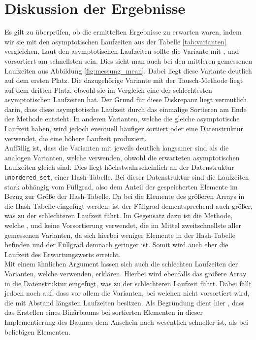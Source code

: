 \section{Diskussion der Ergebnisse}
Es gilt zu überprüfen, ob die ermittelten Ergebnisse zu erwarten waren, indem wir sie 
mit den asymptotischen Laufzeiten aus der Tabelle \ref{tab:varianten} vergleichen.
Laut den asymptotischen Laufzeiten sollte die Variante mit \SorSor{}, \distr{} und vorsortiert am schnellsten
sein. Dies sieht man auch bei den mittleren gemessenen Laufzeiten aus Abbildung \ref{fig:messung_mean}.
Dabei liegt diese Variante deutlich auf dem ersten Platz. Die dazugehörige Variante mit
der Tausch-Methode \perm{} liegt auf dem dritten Platz, obwohl sie im Vergleich eine der
schlechtesten asymptotischen Laufzeiten hat. Der Grund für diese Diskrepanz 
liegt vermutlich darin, dass diese
asymptotische Laufzeit durch das einmalige Sortieren am Ende der Methode entsteht. 
In anderen Varianten, welche die gleiche asymptotische Laufzeit haben, wird jedoch eventuell häufiger
sortiert oder eine Datenstruktur verwendet, die eine höhere Laufzeit produziert.
\\

Auffällig ist, dass die Varianten mit \USetSea{} jeweils deutlich langsamer sind als die analogen
Varianten, welche \SeaUSet{} verwenden, obwohl die erwarteten asymptotischen Laufzeiten
gleich sind. Dies liegt höchstwahrscheinlich an der
Datenstruktur \texttt{unordered\_set}, einer Hash-Tabelle. Bei dieser Datenstruktur
sind die Laufzeiten stark abhängig vom Füllgrad, also dem Anteil der 
gespeicherten Elemente im Bezug zur Größe der Hash-Tabelle. Da bei \USetSea{} die Elemente
des größeren Arrays in die Hash-Tabelle eingefügt werden, ist der Füllgrad dementsprechend
auch größer, was zu der schlechteren Laufzeit führt.
Im Gegensatz dazu ist die Methode, welche \SeaUSet, \perm{} und keine Vorsortierung verwendet,
die im Mittel zweitschnellste aller gemessenen Varianten, da sich hierbei
weniger Elemente in der Hash-Tabelle befinden und der Füllgrad demnach geringer ist. 
Somit wird auch eher die Laufzeit des Erwartungswerts erreicht.
\\

Mit einem ähnlichen Argument lassen sich auch die schlechten Laufzeiten 
der Varianten, welche \SetSea{} verwenden, erklären. Hierbei wird ebenfalls das größere
Array in die Datenstruktur eingefügt, was zu der schlechteren Laufzeit führt.  
Dabei fällt jedoch noch auf, dass vor allem die Varianten, 
bei welchen nicht vorsortiert wird, die mit Abstand längsten Laufzeiten besitzen. Als Begründung 
dient hier , dass das Erstellen eines Binärbaums bei sortierten Elementen in dieser
Implementierung des Baumes dem Anschein nach wesentlich schneller ist, als bei beliebigen Elementen.
\\

